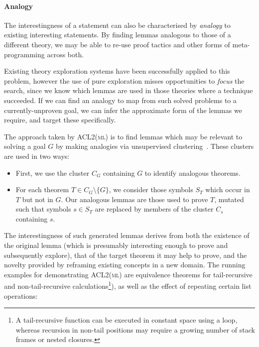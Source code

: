 \paragraph{Analogy}

The interestingness of a statement can also be characterised by \emph{analogy}
to existing interesting statements. By finding lemmas analogous to those of a
different theory, we may be able to re-use proof tactics and other forms of
meta-programming across both.

Existing theory exploration systems have been successfully applied to this
problem, however the use of pure exploration misses opportunities to
\emph{focus} the search, since we know which lemmas are used in those theories
where a technique succeeded. If we can find an analogy to map from such solved
problems to a currently-unproven goal, we can infer the approximate form of the
lemmas we require, and target these specifically.

The approach taken by \textsc{ACL2(ml)} is to find lemmas which may be relevant
to solving a goal $G$ by making analogies via unsupervised
clustering~\cite{Heras.Komendantskaya.Johansson.ea:2013}. These clusters are
used in two ways:

\begin{itemize}
\item First, we use the cluster $C_G$ containing $G$ to identify analogous
  theorems.

\item For each theorem $T \in C_G \setminus \{G\}$, we consider those symbols
  $S_T$ which occur in $T$ but not in $G$. Our analogous lemmas are those used
  to prove $T$, mutated such that symbols $s \in S_T$ are replaced by members of
  the cluster $C_s$ containing $s$.
\end{itemize}

The interestingness of such generated lemmas derives from both the existence of
the original lemma (which is presumably interesting enough to prove and
subsequently explore), that of the target theorem it may help to prove, and the
novelty provided by reframing existing concepts in a new domain. The running
examples for demonstrating \textsc{ACL2(ml)} are equivalence theorems for
tail-recursive and non-tail-recursive calculations\footnote{A tail-recursive
  function can be executed in constant space using a loop, whereas recursion in
  non-tail positions may require a growing number of stack frames or nested
  closures.}), as well as the effect of repeating certain list operations:

